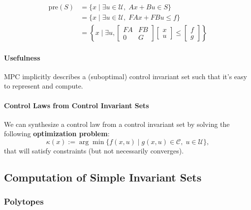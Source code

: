 \newpar{}
\begin{align*}
    \text{pre}(S) & = \{x \mid \exists u \in \mathcal{U}, \; Ax + Bu \in S \}                                                                                                            \\
                  & = \{x \mid \exists u \in \mathcal{U}, \; F A x + F B u \leq f \}                                                                                                     \\
                  & = \left\{ x \mid \exists u, \begin{bmatrix} F A & F B \\ 0 & G \end{bmatrix} \begin{bmatrix} x \\ u \end{bmatrix} \leq \begin{bmatrix} f \\ g \end{bmatrix} \right\}
\end{align*}

\paragraph{Usefulness}
MPC implicitly describes a (suboptimal) control invariant set such that it's easy to represent and compute.

\paragraph{Control Laws from Control Invariant Sets}

We can synthesize a control law from a control invariant set by solving the following \textbf{optimization problem}:
\begin{equation*}
    \kappa(x) := \arg\min \{ f(x, u) \mid g(x, u) \in \mathcal{C},\; u \in \mathcal{U} \},
\end{equation*}
that will satisfy constraints (but not necessarily converges).

\subsection{Computation of Simple Invariant Sets}

\subsubsection{Polytopes}
